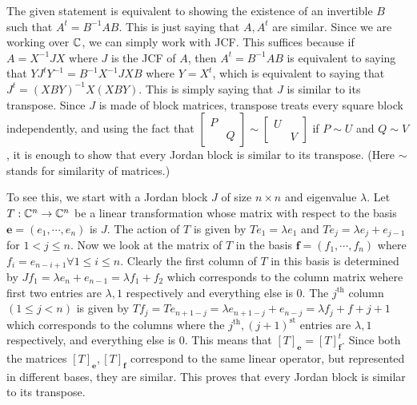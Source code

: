 \begin{sol}
The given statement is equivalent to showing the existence of an invertible $B$ such that $A^t=B^{-1}AB$. This is just saying that $A,A^t$ are similar. Since we are working over $\mathbb{C}$, we can simply work with JCF. This suffices because if $A=X^{-1}JX$ where $J$ is the JCF of $A$, then $A^{t}=B^{-1}AB$ is equivalent to saying that $YJ^tY^{-1} = B^{-1}X^{-1}JXB$ where $Y = X^t$, which is equivalent to saying that $J^t = (XBY)^{-1}X (XBY)$. This is simply saying that $J$ is similar to its transpose. Since $J$ is made of block matrices, transpose treats every square block independently, and using the fact that $\begin{bmatrix}P&\\&Q\end{bmatrix}\sim \begin{bmatrix}U&\\&V\end{bmatrix}$ if $P\sim U$ and $Q\sim V$, it is enough to show that every Jordan block is similar to its transpose. (Here $\sim$ stands for similarity of matrices.)

To see this, we start with a Jordan block $J$ of size $n\times n$ and eigenvalue $\lambda$. Let $T:\mathbb{C}^n\to\mathbb{C}^n$ be a linear transformation whose matrix with respect to the basis $\pmb e=(e_1,\cdots,e_n)$ is $J$. The action of $T$ is given by $Te_1 = \lambda e_1$ and $Te_j = \lambda e_j+e_{j-1}$ for $1<j\leq n$. Now we look at the matrix of $T$ in the basis $\pmb f = (f_1,\cdots,f_n)$ where $f_i = e_{n-i+1}\forall 1\leq i\leq n$. Clearly the first column of $T$ in this basis is determined by $Jf_1 = \lambda e_n + e_{n-1} = \lambda f_1 + f_2$ which corresponds to the column matrix wehere first two entries are $\lambda, 1$ respectively and everything else is $0$. The $j^{\text{th}}$ column $(1\leq j<n)$ is given by $Tf_j = Te_{n+1-j} = \lambda e_{n+1-j} + e_{n-j} = \lambda f_j + f+{j+1}$ which corresponds to the columns where the $j^{\text{th}}, (j+1)^{\text{st}}$ entries are $\lambda, 1$ respectively, and everything else is $0$. This means that $[T]_{\pmb e} = [T]_{\pmb f}^t$. Since both the matrices $[T]_{\pmb e}, [T]_{\pmb f}$ correspond to the same linear operator, but represented in different bases, they are similar. This proves that every Jordan block is similar to its transpose.
\end{sol}